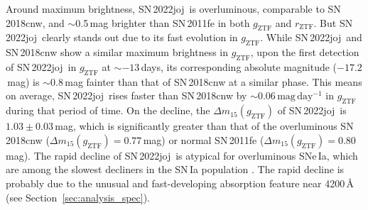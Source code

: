 \documentclass[twocolumn]{aastex631}
\newcommand{\sn}{SN\,2022joj}
\newcommand{\chang}[1]{\textcolor{blue}{[Chang: #1]}}
\begin{document}
\begin{CJK*}{UTF8}{gbsn}
Around maximum brightness, \sn\ is overluminous, comparable to SN\,2018cnw, and $\sim$0.5\,mag brighter than SN\,2011fe in both $g_\mathrm{ZTF}$ and $r_\mathrm{ZTF}$. But \sn\ clearly stands out due to its fast evolution in $g_\mathrm{ZTF}$. While \sn\ and SN\,2018cnw show a similar maximum brightness in $g_\mathrm{ZTF}$, upon the first detection of \sn\ in $g_\mathrm{ZTF}$ at $\sim$$-13$\,days, its corresponding absolute magnitude ($-17.2$\,mag) is $\sim$0.8\,mag fainter than that of SN\,2018cnw at a similar phase. This means on average, \sn\ rises faster than SN\,2018cnw by $\sim$$0.06\,\mathrm{mag\,day^{-1}}$ in $g_\mathrm{ZTF}$ during that period of time. On the decline, the $\Delta m_{15}(g_\mathrm{ZTF})$ of \sn\ is $1.03\pm0.03$\,mag, which is significantly greater than that of the overluminous SN\,2018cnw ($\Delta m_{15}(g_\mathrm{ZTF})=0.77$\,mag) or normal SN\,2011fe ($\Delta m_{15}(g_\mathrm{ZTF})=0.80$\,mag). The rapid decline of \sn\ is atypical for overluminous SNe\,Ia, which are among the slowest decliners in the SN\,Ia population \citep{Phillips_1999, Taubenberger_2017}. The rapid decline is probably due to the unusual and fast-developing absorption feature near 4200\,\r{A} (see Section~\ref{sec:analysis_spec}). %


\end{CJK*}
\end{document}
